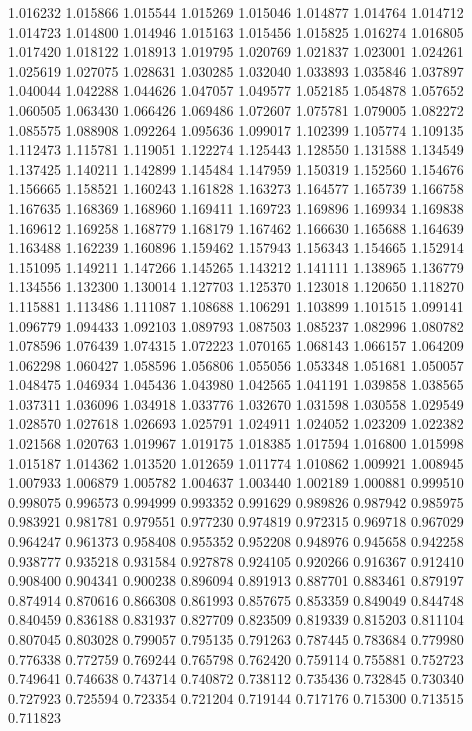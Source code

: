 1.016232
1.015866
1.015544
1.015269
1.015046
1.014877
1.014764
1.014712
1.014723
1.014800
1.014946
1.015163
1.015456
1.015825
1.016274
1.016805
1.017420
1.018122
1.018913
1.019795
1.020769
1.021837
1.023001
1.024261
1.025619
1.027075
1.028631
1.030285
1.032040
1.033893
1.035846
1.037897
1.040044
1.042288
1.044626
1.047057
1.049577
1.052185
1.054878
1.057652
1.060505
1.063430
1.066426
1.069486
1.072607
1.075781
1.079005
1.082272
1.085575
1.088908
1.092264
1.095636
1.099017
1.102399
1.105774
1.109135
1.112473
1.115781
1.119051
1.122274
1.125443
1.128550
1.131588
1.134549
1.137425
1.140211
1.142899
1.145484
1.147959
1.150319
1.152560
1.154676
1.156665
1.158521
1.160243
1.161828
1.163273
1.164577
1.165739
1.166758
1.167635
1.168369
1.168960
1.169411
1.169723
1.169896
1.169934
1.169838
1.169612
1.169258
1.168779
1.168179
1.167462
1.166630
1.165688
1.164639
1.163488
1.162239
1.160896
1.159462
1.157943
1.156343
1.154665
1.152914
1.151095
1.149211
1.147266
1.145265
1.143212
1.141111
1.138965
1.136779
1.134556
1.132300
1.130014
1.127703
1.125370
1.123018
1.120650
1.118270
1.115881
1.113486
1.111087
1.108688
1.106291
1.103899
1.101515
1.099141
1.096779
1.094433
1.092103
1.089793
1.087503
1.085237
1.082996
1.080782
1.078596
1.076439
1.074315
1.072223
1.070165
1.068143
1.066157
1.064209
1.062298
1.060427
1.058596
1.056806
1.055056
1.053348
1.051681
1.050057
1.048475
1.046934
1.045436
1.043980
1.042565
1.041191
1.039858
1.038565
1.037311
1.036096
1.034918
1.033776
1.032670
1.031598
1.030558
1.029549
1.028570
1.027618
1.026693
1.025791
1.024911
1.024052
1.023209
1.022382
1.021568
1.020763
1.019967
1.019175
1.018385
1.017594
1.016800
1.015998
1.015187
1.014362
1.013520
1.012659
1.011774
1.010862
1.009921
1.008945
1.007933
1.006879
1.005782
1.004637
1.003440
1.002189
1.000881
0.999510
0.998075
0.996573
0.994999
0.993352
0.991629
0.989826
0.987942
0.985975
0.983921
0.981781
0.979551
0.977230
0.974819
0.972315
0.969718
0.967029
0.964247
0.961373
0.958408
0.955352
0.952208
0.948976
0.945658
0.942258
0.938777
0.935218
0.931584
0.927878
0.924105
0.920266
0.916367
0.912410
0.908400
0.904341
0.900238
0.896094
0.891913
0.887701
0.883461
0.879197
0.874914
0.870616
0.866308
0.861993
0.857675
0.853359
0.849049
0.844748
0.840459
0.836188
0.831937
0.827709
0.823509
0.819339
0.815203
0.811104
0.807045
0.803028
0.799057
0.795135
0.791263
0.787445
0.783684
0.779980
0.776338
0.772759
0.769244
0.765798
0.762420
0.759114
0.755881
0.752723
0.749641
0.746638
0.743714
0.740872
0.738112
0.735436
0.732845
0.730340
0.727923
0.725594
0.723354
0.721204
0.719144
0.717176
0.715300
0.713515
0.711823
